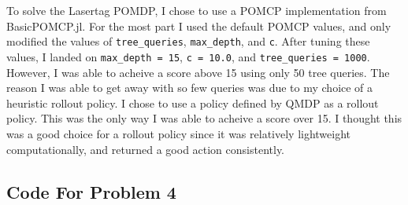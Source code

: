 \documentclass[11pt]{article}
\begin{document}
\section{}

To solve the Lasertag POMDP, I chose to use a POMCP implementation from BasicPOMCP.jl. For the most part I used the default POMCP values, and only modified the values 
of \verb|tree_queries|, \verb|max_depth|, 
and \verb|c|. After tuning these values, I landed on \verb|max_depth = 15|, \verb|c = 10.0|, and \verb|tree_queries = 1000|. However, I was able to acheive a score above 15 using only 50 tree queries.
The reason I was able to get away with so few queries was due to my choice of a heuristic rollout policy. I chose to use a policy defined by QMDP as a rollout policy. This was the only way I was able to acheive a score over 15.
I thought this was a good choice for a rollout policy since it was relatively lightweight computationally, and returned a good action consistently.

\subsection{Code For Problem 4}
\end{document}
